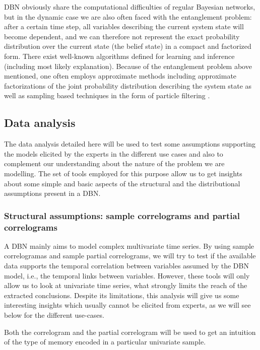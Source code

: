 DBN obviously share the computational difficulties of regular Bayesian networks, but in the dynamic case we are also often faced with the entanglement problem: after a certain time step, all variables describing the current system state will become dependent, and we can therefore not represent the exact probability distribution over the current state (the belief state) in a compact and factorized form. There exist well-known algorithms defined for learning and inference (including most likely explanation). Because of the entanglement problem above mentioned, one often employs approximate methods including approximate factorizations of the joint probability distribution describing the system state \cite{BoyenKoller1998} as well as sampling based techniques in the form of particle filtering \cite{Doucet2000}.

\subsection{Data analysis}\label{SubSection:DataAnalysis}

The data analysis detailed here will be used to test some assumptions supporting the models elicited by the experts in the different use cases and also to complement our understanding about the nature of the problem we are modelling. The set of tools employed for this purpose allow us to get insights about some simple and basic aspects of the structural and the distributional assumptions present in a DBN.

\subsubsection*{Structural assumptions: sample correlograms and partial correlograms}

A DBN mainly aims to model complex multivariate time series. By using sample correlogramas and sample partial correlograms, we will try to test if the available data supports the temporal correlation between variables assumed by the DBN model, i.e., the temporal links between variables. However, these tools will only allow us to look at univariate time series, what strongly limits the reach of the  extracted conclusions. Despite its limitations, this analysis will give us some interesting insights which usually cannot be elicited from experts, as we will see below for the different use-cases.  

Both the correlogram and the partial correlogram will be used to get an intuition of the type of memory encoded in a particular univariate sample. 

